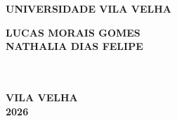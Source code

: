 ﻿\thispagestyle{empty}

\vfill
 \begin{center}
    

    {\large\bfseries UNIVERSIDADE VILA VELHA} \\
    

    \vspace*{1in}
    \begin{large} \bfseries LUCAS MORAIS GOMES \\ NATHALIA DIAS FELIPE \end{large}\\[0.4in]

    \vspace*{4cm}
    \noindent \\
    
    \large\bfseries{}
    \vfill
    \large\bfseries{VILA VELHA \\2026}
\end{center}

\normalsize


